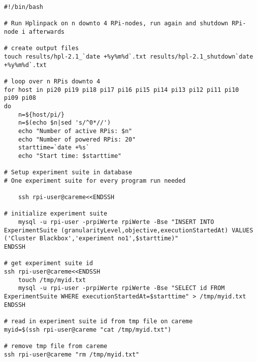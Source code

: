 \begin{verbatim}
#!/bin/bash 

# Run Hplinpack on n downto 4 RPi-nodes, run again and shutdown RPi-node i afterwards 

# create output files                                                                 
touch results/hpl-2.1_`date +%y%m%d`.txt results/hpl-2.1_shutdown`date +%y%m%d`.txt

# loop over n RPis downto 4                                                           
for host in pi20 pi19 pi18 pi17 pi16 pi15 pi14 pi13 pi12 pi11 pi10 pi09 pi08
do
    n=${host/pi/}                                         
    n=$(echo $n|sed 's/^0*//')
    echo "Number of active RPis: $n"
    echo "Number of powered RPis: 20"
    starttime=`date +%s`
    echo "Start time: $starttime"

# Setup experiment suite in database
# One experiment suite for every program run needed 

    ssh rpi-user@careme<<ENDSSH

# initialize experiment suite 
	mysql -u rpi-user -prpiWerte rpiWerte -Bse "INSERT INTO 
ExperimentSuite (granularityLevel,objective,executionStartedAt) VALUES 
('Cluster Blackbox','experiment no1',$starttime)"
ENDSSH

# get experiment suite id 
ssh rpi-user@careme<<ENDSSH                                                                                                                                                 
	touch /tmp/myid.txt                                                                                                                                                         
	mysql -u rpi-user -prpiWerte rpiWerte -Bse "SELECT id FROM 
ExperimentSuite WHERE executionStartedAt=$starttime" > /tmp/myid.txt                                             
ENDSSH

# read in experiment suite id from tmp file on careme 
myid=$(ssh rpi-user@careme "cat /tmp/myid.txt")

# remove tmp file from careme                                                                                                                                               
ssh rpi-user@careme "rm /tmp/myid.txt"


\end{verbatim}
